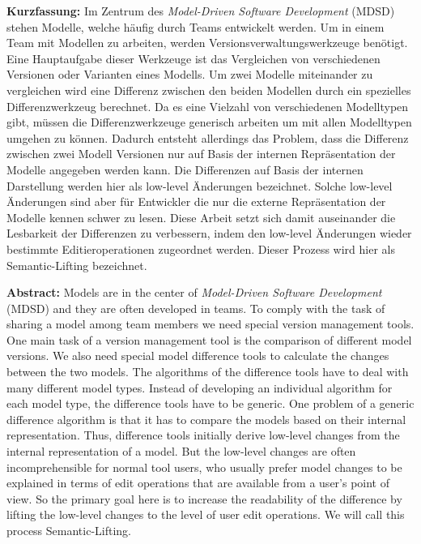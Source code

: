 \textbf{Kurzfassung:}\hspace{0.3cm} Im Zentrum des \textit{Model-Driven Software Development} (MDSD)
stehen Modelle, welche häufig durch Teams entwickelt werden. Um in einem Team mit Modellen zu
arbeiten, werden Versionsverwaltungswerkzeuge benötigt. Eine Hauptaufgabe dieser Werkzeuge ist das
Vergleichen von verschiedenen Versionen oder Varianten eines Modells. Um zwei Modelle miteinander
zu vergleichen wird eine Differenz zwischen den beiden Modellen durch ein spezielles
Differenzwerkzeug berechnet. Da es eine Vielzahl von verschiedenen Modelltypen gibt, müssen die
Differenzwerkzeuge generisch arbeiten um mit allen Modelltypen umgehen zu können. Dadurch entsteht
allerdings das Problem, dass die Differenz zwischen zwei Modell Versionen nur auf Basis der internen
Repräsentation der Modelle angegeben werden kann. Die Differenzen auf Basis der internen Darstellung
werden hier als  low-level Änderungen bezeichnet. Solche low-level Änderungen sind aber für
Entwickler die nur die externe Repräsentation der Modelle kennen schwer zu lesen. Diese Arbeit setzt
sich damit auseinander die Lesbarkeit der Differenzen zu verbessern, indem den low-level Änderungen
wieder bestimmte Editieroperationen zugeordnet werden.
Dieser Prozess wird hier als Semantic-Lifting bezeichnet.

\vspace{1cm}

\textbf{Abstract:} \hspace{0.3cm} Models are in the center of \textit{Model-Driven Software
Development} (MDSD) and they are often developed in teams. To comply with the task of sharing a
model among team members we need special version management tools. One main task of a version
management tool is the comparison of different model versions. We also need special model difference
tools to calculate the changes between the two models. The algorithms of the difference tools have
to deal with many different model types. Instead of developing an individual algorithm for each
model type, the difference tools have to be generic. One problem of a generic difference algorithm
is that it has to compare the models based on their internal representation. Thus, difference tools
initially derive low-level changes from the internal representation of a model. But the low-level
changes are often incomprehensible for normal tool users, who usually prefer model changes to be
explained in terms of edit operations that are available from a user's point of view. So the primary
goal here is to increase the readability of the difference by lifting the low-level changes to the
level of user edit operations. We will call this process Semantic-Lifting.
